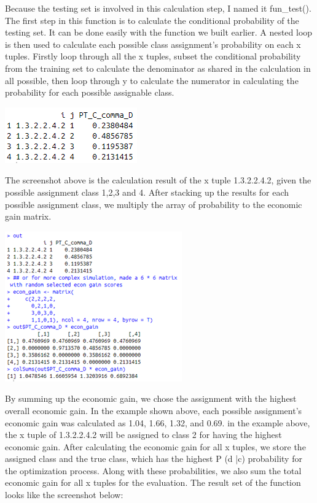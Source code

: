 \documentclass{article}
\begin{document}
\begin{multicols}{2}
Because the testing set is involved in this calculation step, I named it fun\_test(). The first step in this function is to calculate the conditional probability of the testing set. It can be done easily with the function we built earlier. 
A nested loop is then used to calculate each possible class assignment's probability on each x tuples. Firstly loop through all the x tuples, subset the conditional probability from the training set to calculate the denominator as shared in the calculation in all possible, then loop through y to calculate the numerator in calculating the probability for each possible assignable class. 

\includegraphics{fig8.png}

The screenshot above is the calculation result of the x tuple 1.3.2.2.4.2, given the possible assignment class 1,2,3 and 4.
After stacking up the results for each possible assignment class, we multiply the array of probability to the economic gain matrix. 

\includegraphics{fig9.png}

By summing up the economic gain, we chose the assignment with the highest overall economic gain. In the example shown above, each possible assignment's economic gain was calculated as 1.04, 1.66, 1.32, and 0.69. in the example above, the x tuple of 1.3.2.2.4.2 will be assigned to class 2 for having the highest economic gain.
After calculating the economic gain for all x tuples, we store the assigned class and the true class, which has the highest P (d |c) probability for the optimization process. Along with these probabilities, we also sum the total economic gain for all x tuples for the evaluation.
The result set of the function looks like the screenshot below:


\end{multicols}
\end{document}
